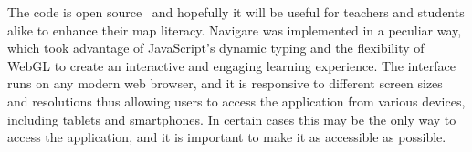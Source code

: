 \documentclass[onecolumn,3p]{elsarticle}
\begin{document}
The code is open source~\cite{Navigare2026} and hopefully it will be useful for teachers and students alike to enhance their map literacy.
Navigare was implemented in a peculiar way, which took advantage of JavaScript's dynamic typing and the flexibility of WebGL
to create an interactive and engaging learning experience.
The interface runs on any modern web browser, and it is responsive to different screen sizes and resolutions
thus allowing users to access the application from various devices, including tablets and smartphones.
In certain cases this may be the only way to access the application, and it is important to make it as accessible as possible.

\newpage


\end{document}

